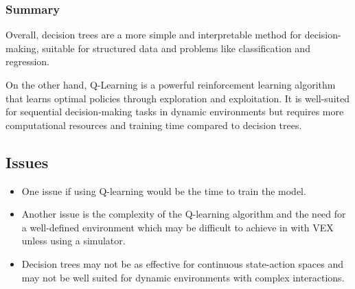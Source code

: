 \subsubsection{Summary}
Overall, decision trees are a more simple and interpretable method for decision-making, 
suitable for structured data and problems like classification and regression. 

On the other hand, Q-Learning is a powerful reinforcement learning algorithm that learns 
optimal policies through exploration and exploitation. It is well-suited for sequential 
decision-making tasks in dynamic environments but requires more computational resources 
and training time compared to decision trees.

\subsection*{Issues}
\begin{itemize}
    \item One issue if using Q-learning would be the time to train the model.
    \item Another issue is the complexity of the Q-learning algorithm and the need for a well-defined environment which may be difficult to achieve in with VEX unless using a simulator.
    \item Decision trees may not be as effective for continuous state-action spaces and may not be well suited for dynamic environments with complex interactions.
\end{itemize}

